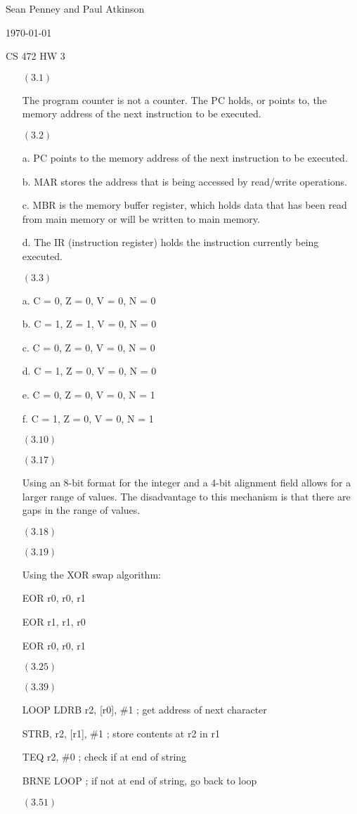 \documentclass[letterpaper,10pt,titlepage]{article}
\def\name{Sean Penney and Paul Atkinson}
\begin{document}
\hfill \name

\hfill \today

\hfill CS 472 HW 3

\begin{enumerate}
\item[$(3.1)$] 

  The program counter is not a counter.  The PC holds, or points to, the memory address of the next instruction to be executed.

\item[$(3.2)$]

  a.  PC points to the memory address of the next instruction to be executed.
  
  b.  MAR stores the address that is being accessed by read/write operations.
  
  c.  MBR is the memory buffer register, which holds data that has been read from main memory or will be written to main memory.
  
  d.  The IR (instruction register) holds the instruction currently being executed.

\item[$(3.3)$]

  a.  C = 0, Z = 0, V = 0, N = 0
  
  b.  C = 1, Z = 1, V = 0, N = 0
  
  c.  C = 0, Z = 0, V = 0, N = 0
  
  d.  C = 1, Z = 0, V = 0, N = 0
  
  e.  C = 0, Z = 0, V = 0, N = 1
  
  f.  C = 1, Z = 0, V = 0, N = 1
  
\item[$(3.10)$]
  
  
\item[$(3.17)$]

  Using an 8-bit format for the integer and a 4-bit alignment field allows for a larger range of values.
  The disadvantage to this mechanism is that there are gaps in the range of values.

\item[$(3.18)$]
  
\item[$(3.19)$]   
  
  Using the XOR swap algorithm:
  
  EOR r0, r0, r1
  
  EOR r1, r1, r0
  
  EOR r0, r0, r1

\item[$(3.25)$]
  
  
\item[$(3.39)$]

LOOP	LDRB r2, [r0], \#1	; get address of next character

		STRB, r2, [r1], \#1	; store contents at r2 in r1

		TEQ r2, \#0			; check if at end of string

		BRNE LOOP			; if not at end of string, go back to loop
		
  
\item[$(3.51)$]
  
\end{enumerate}
\end{document}
